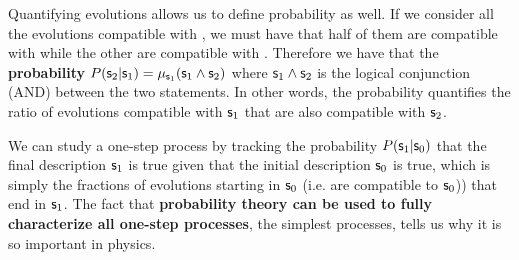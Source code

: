 \documentclass[letterpaper]{article}
\begin{document}
Quantifying evolutions allows us to define probability as well. If we consider all the evolutions compatible with , we must have that half of them are compatible with  while the other are compatible with .  Therefore we have that the \textbf{probability} $P(\mathsf{s}_2 | \mathsf{s}_1) = \mu_{\mathsf{s}_1}(\mathsf{s}_1 \wedge \mathsf{s}_2)$ where $\mathsf{s}_1 \wedge \mathsf{s}_2$ is the logical conjunction (AND) between the two statements. In other words, the probability quantifies the ratio of evolutions compatible with $\mathsf{s}_1$ that are also compatible with $\mathsf{s}_2$.

We can study a one-step process by tracking the probability $P(\mathsf{s}_1 | \mathsf{s}_0)$ that the final description $\mathsf{s}_1$ is true given that the initial description $\mathsf{s}_0$ is true, which is simply the fractions of evolutions starting in $\mathsf{s}_0$ (i.e. are compatible to $\mathsf{s}_0$)) that end in $\mathsf{s}_1$. The fact that \textbf{probability theory can be used to fully characterize all one-step processes}, the simplest processes, tells us why it is so important in physics.


\end{document}
